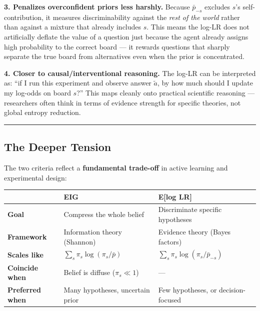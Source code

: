 \documentclass[
]{article}
\begin{document}
\textbf{3. Penalizes overconfident priors less harshly.} Because
\(\bar{p}_{-s}\) excludes \(s\)'s self-contribution, it measures
discriminability against the \emph{rest of the world} rather than
against a mixture that already includes \(s\). This means the log-LR
does not artificially deflate the value of a question just because the
agent already assigns high probability to the correct board --- it
rewards questions that sharply separate the true board from alternatives
even when the prior is concentrated.

\textbf{4. Closer to causal/interventional reasoning.} The log-LR can be
interpreted as: ``if I run this experiment and observe answer
\(\tilde{a}\), by how much should I update my log-odds on board \(s\)?''
This maps cleanly onto practical scientific reasoning --- researchers
often think in terms of evidence strength for specific theories, not
global entropy reduction.

\begin{center}\rule{0.5\linewidth}{0.5pt}\end{center}

\subsection{The Deeper Tension}\label{the-deeper-tension}

The two criteria reflect a \textbf{fundamental trade-off} in active
learning and experimental design:

\begin{longtable}[]{@{}
  >{\raggedright\arraybackslash}p{}
  >{\raggedright\arraybackslash}p{}
  >{\raggedright\arraybackslash}p{}@{}}
\toprule\noalign{}
\begin{minipage}[b]{\linewidth}\raggedright
\end{minipage} & \begin{minipage}[b]{\linewidth}\raggedright
EIG
\end{minipage} & \begin{minipage}[b]{\linewidth}\raggedright
E{[}log LR{]}
\end{minipage} \\
\midrule\noalign{}
\endhead
\bottomrule\noalign{}
\endlastfoot
\textbf{Goal} & Compress the whole belief & Discriminate specific
hypotheses \\
\textbf{Framework} & Information theory (Shannon) & Evidence theory
(Bayes factors) \\
\textbf{Scales like} & \(\sum_s \pi_s \log(\pi_s / \bar p)\) &
\(\sum_s \pi_s \log(\pi_s / \bar p_{-s})\) \\
\textbf{Coincide when} & Belief is diffuse (\(\pi_s \ll 1\)) & --- \\
\textbf{Preferred when} & Many hypotheses, uncertain prior & Few
hypotheses, or decision-focused \\
\end{longtable}
\end{document}
